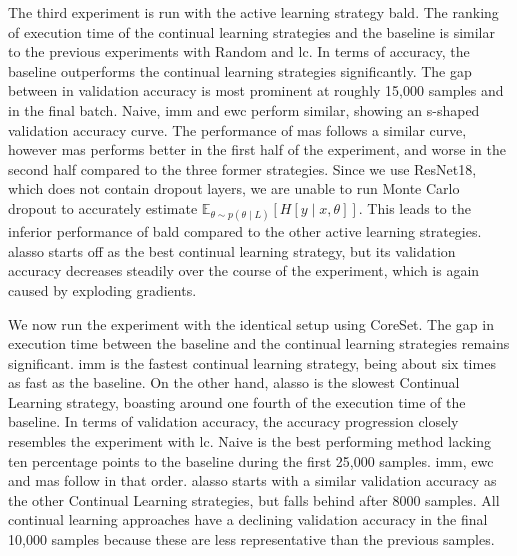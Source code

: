 The third experiment is run with the active learning strategy \gls{bald}. The ranking of execution time of the continual
learning strategies and the baseline is similar to the previous experiments with Random and \gls{lc}. In terms of accuracy, the baseline outperforms the continual learning strategies significantly. The gap between
in validation accuracy is most prominent at roughly 15,000 samples and in the final batch. Naive, \gls{imm} and \gls{ewc} perform similar, showing an
s-shaped validation accuracy curve. The performance of \gls{mas} follows a similar curve, however \gls{mas} performs better in the first half of the experiment, and worse in the second half compared to the
three former strategies. Since we use ResNet18, which does not contain dropout layers, we are unable to run Monte Carlo dropout to accurately estimate $\mathbb{E}_{\theta \sim p(\theta \mid L)} [H[y \mid x, \theta]]$.
This leads to the inferior performance of \gls{bald} compared to the other active learning strategies. \gls{alasso} starts off as
the best continual learning strategy, but its validation accuracy decreases steadily over the course of the experiment, which is again caused by exploding gradients. \par 



We now run the experiment with the identical setup using CoreSet. The gap in execution time between the baseline and the continual learning 
strategies remains significant. \gls{imm} is the fastest continual learning strategy, being about six times as fast as the baseline. On the other hand, \gls{alasso} is the slowest Continual Learning strategy,
boasting around one fourth of the execution time of the baseline. In terms of validation accuracy, the accuracy progression closely resembles the experiment with \gls{lc}. Naive is the best performing method
lacking ten percentage points to the baseline during the first 25,000 samples. \gls{imm}, \gls{ewc} and \gls{mas} follow in that order. \gls{alasso} starts with a similar validation accuracy
as the other Continual Learning strategies, but falls behind after 8000 samples. All continual learning approaches have a declining validation accuracy in the final 10,000 samples because these are less representative
than the previous samples. \par



